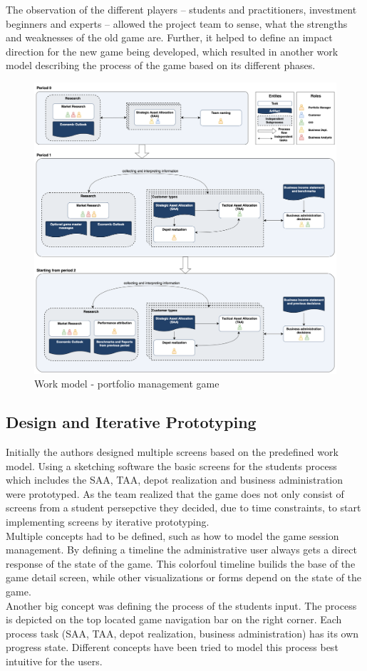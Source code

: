 The observation of the different players – students and practitioners, investment beginners and experts – allowed the project team to sense, what the strengths and weaknesses of the old game are. Further, it helped to define an impact direction for the new game being developed, which resulted in another work model describing the process of the game based on its different phases. %

\begin{figure}[h!]
  \centering
  \includegraphics[scale=0.25]{img/work_model_pfm_game.png}
  \caption{Work model - portfolio management game}
\end{figure}

\subsection{Design and Iterative Prototyping}
Initially the authors designed multiple screens based on the predefined work model. Using a sketching software the basic screens for the students process which includes the SAA, TAA, depot realization and business administration were prototyped. As the team realized that the game does not only consist of screens from a student persepctive they decided, due to time constraints, to start implementing screens by iterative prototyping. \\

Multiple concepts had to be defined, such as how to model the game session management. By defining a timeline the administrative user always gets a direct response of the state of the game. This colorfoul timeline builids the base of the game detail screen, while other visualizations or forms depend on the state of the game.\\

Another big concept was defining the process of the students input. The process is depicted on the top located game navigation bar on the right corner. Each process task (SAA, TAA, depot realization, business administration) has its own progress state. Different concepts have been tried to model this process best intuitive for the users.
